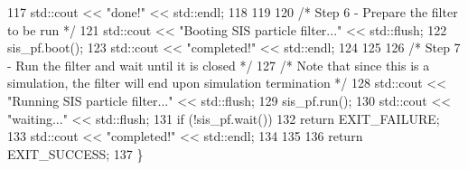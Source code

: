 \begin{DoxyCodeInclude}
117     std::cout << \textcolor{stringliteral}{"done!"} << std::endl;
118 
119 
120     \textcolor{comment}{/* Step 6 - Prepare the filter to be run */}
121     std::cout << \textcolor{stringliteral}{"Booting SIS particle filter..."} << std::flush;
122     sis\_pf.boot();
123     std::cout << \textcolor{stringliteral}{"completed!"} << std::endl;
124 
125 
126     \textcolor{comment}{/* Step 7 - Run the filter and wait until it is closed */}
127     \textcolor{comment}{/* Note that since this is a simulation, the filter will end upon simulation termination */}
128     std::cout << \textcolor{stringliteral}{"Running SIS particle filter..."} << std::flush;
129     sis\_pf.run();
130     std::cout << \textcolor{stringliteral}{"waiting..."} << std::flush;
131     \textcolor{keywordflow}{if} (!sis\_pf.wait())
132         \textcolor{keywordflow}{return} EXIT\_FAILURE;
133     std::cout << \textcolor{stringliteral}{"completed!"} << std::endl;
134 
135 
136     \textcolor{keywordflow}{return} EXIT\_SUCCESS;
137 \}
\end{DoxyCodeInclude}
 